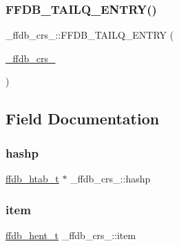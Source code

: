 \mbox{\label{struct__ffdb__crs___ab69f088c55ed68ebc0cc2ed6342ef782}} 
\subsubsection{\texorpdfstring{FFDB\_TAILQ\_ENTRY()}{FFDB\_TAILQ\_ENTRY()}\hspace{0.1cm}{\footnotesize\ttfamily [2/2]}}
{\footnotesize\ttfamily \+\_\+ffdb\+\_\+crs\+\_\+\+::\+F\+F\+D\+B\+\_\+\+T\+A\+I\+L\+Q\+\_\+\+E\+N\+T\+RY (\begin{DoxyParamCaption}\item[{\mbox{\hyperlink{struct__ffdb__crs__}{\+\_\+ffdb\+\_\+crs\+\_\+}}}]{ }\end{DoxyParamCaption})}



\subsection{Field Documentation}
\mbox{\label{struct__ffdb__crs___a527aa734d76183b95d87e2e725bdc8db}} 
\subsubsection{\texorpdfstring{hashp}{hashp}}
{\footnotesize\ttfamily \mbox{\hyperlink{adat-devel_2other__libs_2filedb_2filehash_2ffdb__hash_8h_ae592010ed2bedc975d3cc0b7d074b9d1}{ffdb\+\_\+htab\+\_\+t}} $\ast$ \+\_\+ffdb\+\_\+crs\+\_\+\+::hashp}

\mbox{\label{struct__ffdb__crs___afa4e8bde8a789a61d3078df069fd70d1}} 
\subsubsection{\texorpdfstring{item}{item}}
{\footnotesize\ttfamily \mbox{\hyperlink{adat-devel_2other__libs_2filedb_2filehash_2ffdb__hash_8h_aa1cea5ccbd6513ed152988f7a71a936d}{ffdb\+\_\+hent\+\_\+t}} \+\_\+ffdb\+\_\+crs\+\_\+\+::item}

